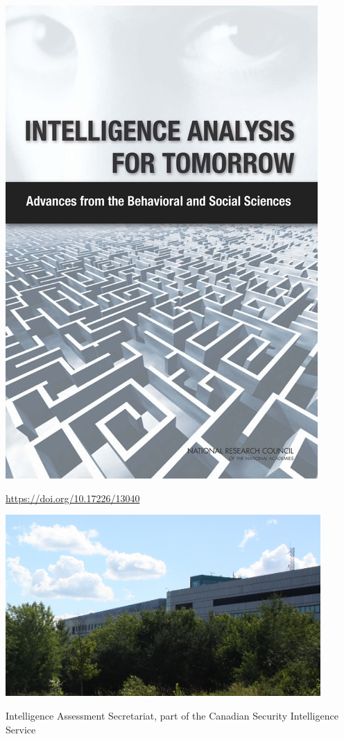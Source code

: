 \documentclass[aspectratio=169]{beamer}
\begin{document}
\begin{frame}

\begin{center}
\includegraphics[height=0.7\textheight]{figures/nas_intellegence_2011_cover}
\end{center}

\vfill
\url{https://doi.org/10.17226/13040}

\end{frame}
\begin{frame}

\begin{center}
\includegraphics[width=0.9\textwidth]{figures/CSIS_Ottawa_Building_Ogilvie_Canadian_Security_Intelligence_Service_(50182903412)}
\end{center}

\vfill
Intelligence Assessment Secretariat, part of the Canadian Security Intelligence Service
\end{frame}
\end{document}
